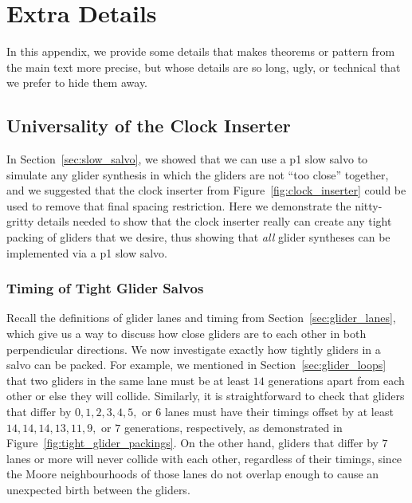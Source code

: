 
\renewcommand{\chapterfolder}{glider_synthesis/}

\chapter{Extra Details}\label{chp:appendix_extras}

In this appendix, we provide some details that makes theorems or pattern from the main text more precise, but whose details are so long, ugly, or technical that we prefer to hide them away.

\section{Universality of the Clock Inserter}\label{chp:appendix_salvo}

In Section~\ref{sec:slow_salvo}, we showed that we can use a p1 slow salvo to simulate any glider synthesis in which the gliders are not ``too close'' together, and we suggested that the clock inserter from Figure~\ref{fig:clock_inserter} could be used to remove that final spacing restriction. Here we demonstrate the nitty-gritty details needed to show that the clock inserter really can create any tight packing of gliders that we desire, thus showing that \emph{all} glider syntheses can be implemented via a p1 slow salvo.


\subsection{Timing of Tight Glider Salvos}\label{sec:salvo_timing}

Recall the definitions of glider lanes and timing from Section~\ref{sec:glider_lanes}, which give us a way to discuss how close gliders are to each other in both perpendicular directions. We now investigate exactly how tightly gliders in a salvo can be packed. For example, we mentioned in Section~\ref{sec:glider_loops} that two gliders in the same lane must be at least $14$ generations apart from each other or else they will collide. Similarly, it is straightforward to check that gliders that differ by $0, 1, 2, 3, 4, 5,$ or $6$ lanes must have their timings offset by at least $14, 14, 14, 13, 11, 9,$ or $7$ generations, respectively, as demonstrated in Figure~\ref{fig:tight_glider_packings}. On the other hand, gliders that differ by $7$ lanes or more will never collide with each other, regardless of their timings, since the Moore neighbourhoods of those lanes do not overlap enough to cause an unexpected birth between the gliders.

